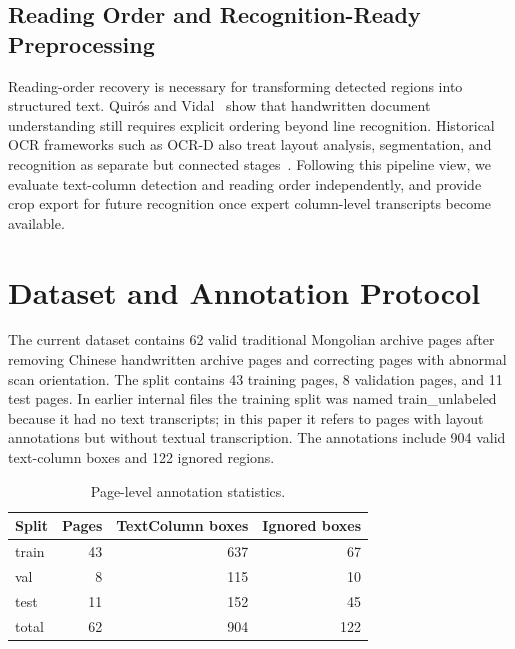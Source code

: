 \documentclass[pdflatex,sn-mathphys-num]{sn-jnl}
\begin{document}
\subsection{Reading Order and Recognition-Ready Preprocessing}
Reading-order recovery is necessary for transforming detected regions into structured text. Quir\'os and Vidal~\cite{quiros2022reading} show that handwritten document understanding still requires explicit ordering beyond line recognition. Historical OCR frameworks such as OCR-D also treat layout analysis, segmentation, and recognition as separate but connected stages~\cite{neudecker2019ocrd}. Following this pipeline view, we evaluate text-column detection and reading order independently, and provide crop export for future recognition once expert column-level transcripts become available.

\section{Dataset and Annotation Protocol}
The current dataset contains 62 valid traditional Mongolian archive pages after removing Chinese handwritten archive pages and correcting pages with abnormal scan orientation. The split contains 43 training pages, 8 validation pages, and 11 test pages. In earlier internal files the training split was named train\_unlabeled because it had no text transcripts; in this paper it refers to pages with layout annotations but without textual transcription. The annotations include 904 valid text-column boxes and 122 ignored regions.

\begin{table}[t]
\centering
\scriptsize\setlength{\tabcolsep}{3pt}
\caption{Page-level annotation statistics.}
\label{tab:data_stats}
\begin{tabular}{lrrr}
\toprule
Split & Pages & TextColumn boxes & Ignored boxes \\
\midrule
train & 43 & 637 & 67 \\
val & 8 & 115 & 10 \\
test & 11 & 152 & 45 \\
\midrule
total & 62 & 904 & 122 \\
\bottomrule
\end{tabular}
\end{table}
\end{document}
